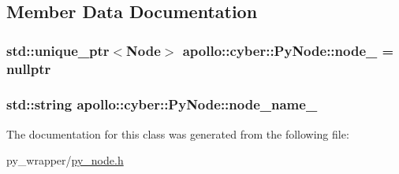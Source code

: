 \subsection{Member Data Documentation}
\hypertarget{classapollo_1_1cyber_1_1PyNode_a366c56a5a7c1d5c03a72c1ebcf246820}{
\subsubsection[{node\-\_\-}]{\setlength{\rightskip}{0pt plus 5cm}std\-::unique\-\_\-ptr$<${\bf Node}$>$ apollo\-::cyber\-::\-Py\-Node\-::node\-\_\- = nullptr\hspace{0.3cm}{\ttfamily [private]}}}\label{classapollo_1_1cyber_1_1PyNode_a366c56a5a7c1d5c03a72c1ebcf246820}
\hypertarget{classapollo_1_1cyber_1_1PyNode_aaabbfc592e52cc2501e2b4c9685927c9}{
\subsubsection[{node\-\_\-name\-\_\-}]{\setlength{\rightskip}{0pt plus 5cm}std\-::string apollo\-::cyber\-::\-Py\-Node\-::node\-\_\-name\-\_\-\hspace{0.3cm}{\ttfamily [private]}}}\label{classapollo_1_1cyber_1_1PyNode_aaabbfc592e52cc2501e2b4c9685927c9}


The documentation for this class was generated from the following file\-:\begin{DoxyCompactItemize}
\item 
py\-\_\-wrapper/\hyperlink{py__node_8h}{py\-\_\-node.\-h}\end{DoxyCompactItemize}
